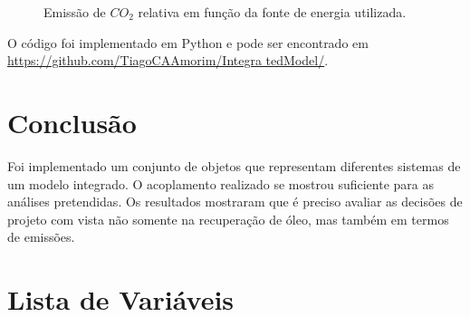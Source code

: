 \documentclass[final,5p]{elsarticle}
\numberwithin{equation}{section}
\begin{document}
        \begin{figure}[hbt!]
            \caption{Emissão de $CO_2$ relativa em função da fonte de energia utilizada.}
            \label{fig:emissaorelsens}
        \end{figure}

        O código foi implementado em Python e pode ser encontrado em \href{https://github.com/TiagoCAAmorim/IntegratedModel/}{https://github.com/TiagoCAAmorim/Integra tedModel/}.

    \section{Conclusão}
        Foi implementado um conjunto de objetos que representam diferentes sistemas de um modelo integrado. O acoplamento realizado se mostrou suficiente para as análises pretendidas.
        Os resultados mostraram que é preciso avaliar as decisões de projeto com vista não somente na recuperação de óleo, mas também em termos de emissões.



\appendix

    \section{Lista de Variáveis}
\end{document}

